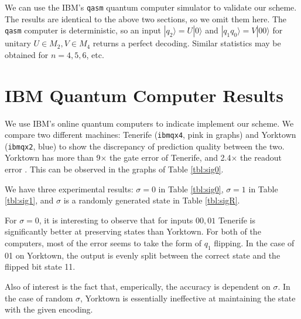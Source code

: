 \documentclass[11pt]{article}
\def\ra{{\rangle}}
\begin{document}
We can use the IBM's \verb|qasm| quantum computer simulator to validate our scheme. The results are identical to the above two sections, so we omit them here. The \verb|qasm| computer is deterministic, so an input $|q_2\ra = U|0\ra$ and  $|q_1q_0\ra = V|00\ra$ for unitary $U \in M_2, V \in M_4$ returns a perfect decoding. Similar statistics may be obtained for $n = 4,5,6$, etc.

\section{IBM Quantum Computer Results}

We use IBM's online quantum computers to indicate implement our scheme. We compare two different machines: Tenerife (\verb|ibmqx4|, pink in graphs) and Yorktown (\verb|ibmqx2|, blue) to show the discrepancy of prediction quality between the two. Yorktown has more than 9$\times$ the gate error of Tenerife, and 2.4$\times$ the readout error \cite{ERR}. This can be observed in the graphs of Table \ref{tbl:sig0}.

We have three experimental results: $\sigma = 0$ in Table \ref{tbl:sig0}, $\sigma = 1$ in Table \ref{tbl:sig1}, and $\sigma$ is a randomly generated state in Table \ref{tbl:sigR}.

For $\sigma = 0$, it is interesting to observe that for inputs $00, 01$ Tenerife is significantly better at preserving states than Yorktown. For both of the computers, most of the error seems to take the form of $q_1$ flipping. In the case of 01 on Yorktown, the output is evenly split between the correct state and the flipped bit state 11.

Also of interest is the fact that, emperically, the accuracy is dependent on $\sigma$. In the case of random $\sigma$, Yorktown is essentially ineffective at maintaining the state with the given encoding. 
\end{document}
